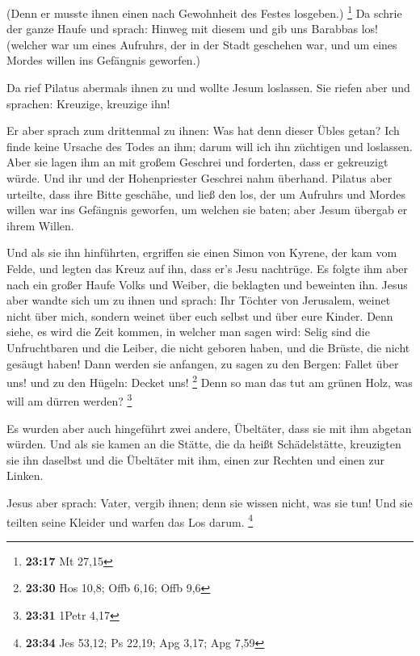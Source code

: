  (Denn er musste ihnen einen nach Gewohnheit des Festes
losgeben.) \footnote{\textbf{23:17} Mt 27,15}  Da schrie
der ganze Haufe und sprach: Hinweg mit diesem und gib uns Barabbas los!
 (welcher war um eines Aufruhrs, der in der Stadt
geschehen war, und um eines Mordes willen ins Gefängnis geworfen.)

 Da rief Pilatus abermals ihnen zu und wollte Jesum
loslassen.  Sie riefen aber und sprachen: Kreuzige,
kreuzige ihn!

 Er aber sprach zum drittenmal zu ihnen: Was hat denn
dieser Übles getan? Ich finde keine Ursache des Todes an ihm; darum will
ich ihn züchtigen und loslassen.  Aber sie lagen ihm an
mit großem Geschrei und forderten, dass er gekreuzigt würde. Und ihr und
der Hohenpriester Geschrei nahm überhand.  Pilatus aber
urteilte, dass ihre Bitte geschähe,  und ließ den los,
der um Aufruhrs und Mordes willen war ins Gefängnis geworfen, um welchen
sie baten; aber Jesum übergab er ihrem Willen.

 Und als sie ihn hinführten, ergriffen sie einen Simon
von Kyrene, der kam vom Felde, und legten das Kreuz auf ihn, dass er's
Jesu nachtrüge.  Es folgte ihm aber nach ein großer Haufe
Volks und Weiber, die beklagten und beweinten ihn.  Jesus
aber wandte sich um zu ihnen und sprach: Ihr Töchter von Jerusalem,
weinet nicht über mich, sondern weinet über euch selbst und über eure
Kinder.  Denn siehe, es wird die Zeit kommen, in welcher
man sagen wird: Selig sind die Unfruchtbaren und die Leiber, die nicht
geboren haben, und die Brüste, die nicht gesäugt haben! 
Dann werden sie anfangen, zu sagen zu den Bergen: Fallet über uns! und
zu den Hügeln: Decket uns! \footnote{\textbf{23:30} Hos 10,8; Offb 6,16;
  Offb 9,6}  Denn so man das tut am grünen Holz, was will
am dürren werden? \footnote{\textbf{23:31} 1Petr 4,17}

 Es wurden aber auch hingeführt zwei andere, Übeltäter,
dass sie mit ihm abgetan würden.  Und als sie kamen an
die Stätte, die da heißt Schädelstätte, kreuzigten sie ihn daselbst und
die Übeltäter mit ihm, einen zur Rechten und einen zur Linken.

 Jesus aber sprach: Vater, vergib ihnen; denn sie wissen
nicht, was sie tun! Und sie teilten seine Kleider und warfen das Los
darum. \footnote{\textbf{23:34} Jes 53,12; Ps 22,19; Apg 3,17; Apg 7,59}

